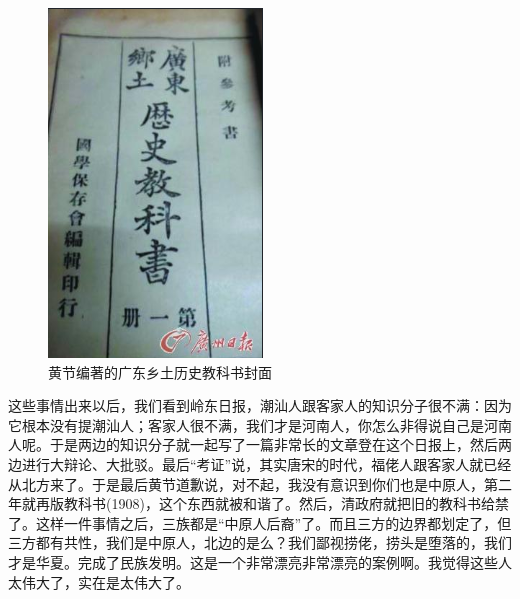 \begin{figure}
	\centering
	\includegraphics[width=\textwidth]{images/image-77}
	\caption{黄节编著的广东乡土历史教科书封面}
\end{figure}

这些事情出来以后，我们看到岭东日报，潮汕人跟客家人的知识分子很不满：因为它根本没有提潮汕人；客家人很不满，我们才是河南人，你怎么非得说自己是河南人呢。于是两边的知识分子就一起写了一篇非常长的文章登在这个日报上，然后两边进行大辩论、大批驳。最后“考证”说，其实唐宋的时代，福佬人跟客家人就已经从北方来了。于是最后黄节道歉说，对不起，我没有意识到你们也是中原人，第二年就再版教科书(1908)，这个东西就被和谐了。然后，清政府就把旧的教科书给禁了。这样一件事情之后，三族都是“中原人后裔”了。而且三方的边界都划定了，但三方都有共性，我们是中原人，北边的是么？我们鄙视捞佬，捞头是堕落的，我们才是华夏。完成了民族发明。这是一个非常漂亮非常漂亮的案例啊。我觉得这些人太伟大了，实在是太伟大了。

